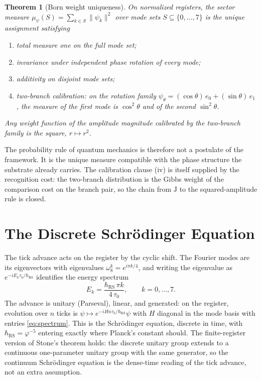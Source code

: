 \documentclass[11pt,letterpaper]{article}
\newtheorem{theorem}{Theorem}[section]
\theoremstyle{definition}
\newcommand{\J}{\mathrm{J}}
\newcommand{\phiG}{\varphi}
\newcommand{\RS}{\mathrm{RS}}
\begin{document}
\begin{theorem}[Born weight uniqueness]\label{thm:born}
On normalized registers, the sector measure
$\mu_\psi(S)=\sum_{k\in S}\|\psi_k\|^2$ over mode sets
$S\subseteq\{0,\ldots,7\}$ is the unique assignment satisfying
\begin{enumerate}[nosep,label=\textup{(\roman*)}]
\item total measure one on the full mode set;
\item invariance under independent phase rotation of every mode;
\item additivity on disjoint mode sets;
\item two-branch calibration: on the rotation family
$\psi_\theta=(\cos\theta)\,e_0+(\sin\theta)\,e_1$, the measure of the
first mode is $\cos^2\theta$ and of the second $\sin^2\theta$.
\end{enumerate}
Any weight function of the amplitude magnitude calibrated by the
two-branch family is the square, $r\mapsto r^2$.
\end{theorem}

The probability rule of quantum mechanics is therefore not a postulate
of the framework.  It is the unique measure compatible with the phase
structure the substrate already carries.  The calibration clause (iv)
is itself supplied by the recognition cost: the two-branch
distribution is the Gibbs weight of the comparison cost on the branch
pair, so the chain from $\J$ to the squared-amplitude rule is closed.

\section{The Discrete Schr\"odinger Equation}
\label{sec:schrodinger}

The tick advance acts on the register by the cyclic shift.  The
Fourier modes are its eigenvectors with eigenvalues
$\omega_8^k=e^{i\pi k/4}$, and writing the eigenvalue as
$e^{-iE_k\tau_0/\hbar_\RS}$ identifies the energy spectrum
\begin{equation}\label{eq:spectrum}
E_k=\frac{\hbar_\RS\,\pi k}{4\,\tau_0},\qquad k=0,\ldots,7 .
\end{equation}
The advance is unitary (Parseval), linear, and generated: on the
register, evolution over $n$ ticks is
$\psi\mapsto e^{-iH n\tau_0/\hbar_\RS}\psi$ with $H$ diagonal in the
mode basis with entries \eqref{eq:spectrum}.  This is the
Schr\"odinger equation, discrete in time, with $\hbar_\RS=\phiG^{-5}$
entering exactly where Planck's constant should.  The finite-register
version of Stone's theorem holds: the discrete unitary group extends to
a continuous one-parameter unitary group with the same generator, so
the continuum Schr\"odinger equation is the dense-time reading of the
tick advance, not an extra assumption.
\end{document}

